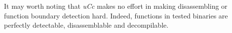 \documentclass[a4paper]{llncs}
\begin{document}
It may worth noting that \emph{uCc} makes no effort in making disassembling or function
boundary detection hard. Indeed, functions in tested binaries are perfectly detectable,
disassemblable and decompilable.


\end{document}
